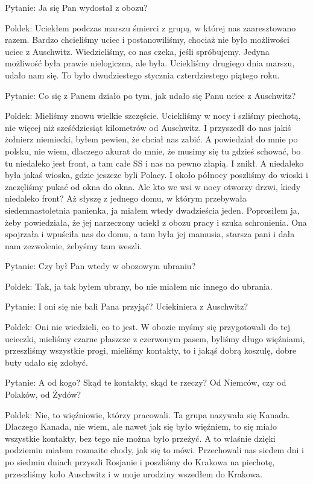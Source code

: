 Pytanie: Ja się Pan wydostał z obozu? 

Poldek: Uciekłem podczas marszu śmierci z grupą, w której nas zaaresztowano razem.  Bardzo chcieliśmy uciec i postanowiliśmy, chociaż nie było możliwości uciec z Auschwitz. Wiedzieliśmy, co nas czeka, jeśli spróbujemy. Jedyna możliwość była prawie nielogiczna, ale była. Uciekliśmy drugiego dnia marszu, udało nam się. To było dwudziestego stycznia czterdziestego piątego roku. 

Pytanie: Co się z Panem działo po tym, jak udało się Panu uciec z Auschwitz? 

Poldek: Mieliśmy znowu wielkie szczęście. Uciekliśmy w nocy i szliśmy piechotą, nie więcej niż sześćdziesiąt kilometrów od Auschwitz. I przyszedł do nas jakiś żołnierz niemiecki, byłem pewien, że chciał nas zabić. A powiedział do mnie po polsku, nie wiem, dlaczego akurat do mnie, że musimy się tu gdzieś schować, bo tu niedaleko jest front, a tam całe SS i nas na pewno złapią. I znikł. A niedaleko była jakaś wioska, gdzie jeszcze byli Polacy. I około północy poszliśmy do wioski i zaczęliśmy pukać od okna do okna. Ale kto we wsi w nocy otworzy drzwi, kiedy niedaleko front? Aż słyszę z jednego domu, w którym przebywała siedemnastoletnia panienka, ja miałem wtedy dwadzieścia jeden. Poprosiłem ja, żeby powiedziała, że jej narzeczony uciekł z obozu pracy i szuka schronienia. Ona spojrzała i wpuściła nas do domu, a tam była jej mamusia, starsza pani i dała nam zezwolenie, żebyśmy tam weszli. 

Pytanie: Czy był Pan wtedy w obozowym ubraniu? 

Poldek: Tak, ja tak byłem ubrany, bo nie miałem nic innego do ubrania.  

Pytanie: I oni się nie bali Pana przyjąć? Uciekiniera z Auschwitz? 

Poldek: Oni nie wiedzieli, co to jest. W obozie myśmy się przygotowali do tej ucieczki, mieliśmy czarne płaszcze z czerwonym pasem, byliśmy długo więźniami, przeszliśmy wszystkie progi, mieliśmy kontakty, to i jakąś dobrą koszulę, dobre buty udało się zdobyć. 

Pytanie: A od kogo? Skąd te kontakty, skąd te rzeczy? Od Niemców, czy od Polaków, od Żydów? 

Poldek: Nie, to więźniowie, którzy pracowali. Ta grupa nazywała się Kanada. Dlaczego Kanada, nie wiem, ale nawet jak się było więźniem, to się miało wszystkie kontakty, bez tego nie można było przeżyć. A to właśnie dzięki podziemiu miałem rozmaite chody, jak się to mówi. Przechowali nas siedem dni i po siedmiu dniach przyszli Rosjanie i poszliśmy do Krakowa na piechotę, przeszliśmy koło Auschwitz i w moje urodziny wszedłem do Krakowa. 

